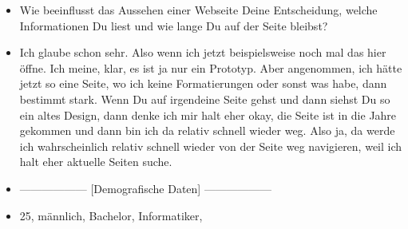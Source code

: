 {\begin{itemize}[]
    \item {} Wie beeinflusst das Aussehen einer Webseite Deine Entscheidung, welche Informationen Du liest und wie lange Du auf der Seite bleibst?
    \item {} Ich glaube schon sehr. 
    Also wenn ich jetzt beispielsweise noch mal das hier öffne.
    Ich meine, klar, es ist ja nur ein Prototyp. 
    Aber angenommen, ich hätte jetzt so eine Seite, wo ich keine Formatierungen oder sonst was habe, dann bestimmt stark.
    Wenn Du auf irgendeine Seite gehst und dann siehst Du so ein altes Design, dann denke ich mir halt eher okay, die Seite ist in die Jahre gekommen und dann bin ich da relativ schnell wieder weg.
    Also ja, da werde ich wahrscheinlich relativ schnell wieder von der Seite weg navigieren, weil ich halt eher aktuelle Seiten suche.
    \item {------------------} [Demografische Daten] {------------------}
    \item {} 25, männlich, Bachelor, Informatiker, 
\end{itemize}}
\nolinenumbers

